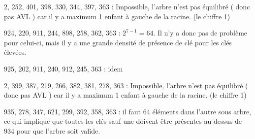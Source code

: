 \documentclass[a4paper]{article}
\begin{document}
2, 252, 401, 398, 330, 344, 397, 363 : Impossible, l'arbre n'est pas équilibré ( donc pas AVL ) car il y a maximum 1 enfant à gauche de la racine. (le chiffre 1)

924, 220, 911, 244, 898, 258, 362, 363 : $2^{7-1} = 64$. Il n'y a donc pas de problème pour celui-ci, mais il y a une grande densité de présence de clé pour les clés élevées.

925, 202, 911, 240, 912, 245, 363 : idem

2, 399, 387, 219, 266, 382, 381, 278, 363 : Impossible, l'arbre n'est pas équilibré ( donc pas AVL ) car il y a maximum 1 enfant à gauche de la racine. (le chiffre 1)

935, 278, 347, 621, 299, 392, 358, 363 : il faut 64 éléments dans l'autre sous arbre, ce qui implique que toutes les clés sauf une doivent être présentes au dessus de 934 pour que l'arbre soit valide.
\end{document}
